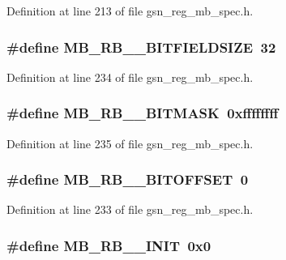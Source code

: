 Definition at line 213 of file gsn\_\-reg\_\-mb\_\-spec.h.

\hypertarget{a00562_adb96bbdd834208299efc18898b085190}{
\subsubsection[{MB\_\-RB\_\-1\_\-BITFIELDSIZE}]{\setlength{\rightskip}{0pt plus 5cm}\#define MB\_\-RB\_\_\-BITFIELDSIZE~32}}
\label{a00562_adb96bbdd834208299efc18898b085190}


Definition at line 234 of file gsn\_\-reg\_\-mb\_\-spec.h.

\hypertarget{a00562_a7e415b912d8d643788caf2a183d3737b}{
\subsubsection[{MB\_\-RB\_\-1\_\-BITMASK}]{\setlength{\rightskip}{0pt plus 5cm}\#define MB\_\-RB\_\_\-BITMASK~0xffffffff}}
\label{a00562_a7e415b912d8d643788caf2a183d3737b}


Definition at line 235 of file gsn\_\-reg\_\-mb\_\-spec.h.

\hypertarget{a00562_a42b3ac26f820d3b6228166d830a65b80}{
\subsubsection[{MB\_\-RB\_\-1\_\-BITOFFSET}]{\setlength{\rightskip}{0pt plus 5cm}\#define MB\_\-RB\_\_\-BITOFFSET~0}}
\label{a00562_a42b3ac26f820d3b6228166d830a65b80}


Definition at line 233 of file gsn\_\-reg\_\-mb\_\-spec.h.

\hypertarget{a00562_afa00a44690c1446d4527094ba91c88e9}{
\subsubsection[{MB\_\-RB\_\-1\_\-INIT}]{\setlength{\rightskip}{0pt plus 5cm}\#define MB\_\-RB\_\_\-INIT~0x0}}
\label{a00562_afa00a44690c1446d4527094ba91c88e9}


